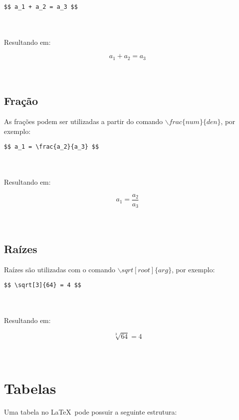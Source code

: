 \documentclass[12pt,a4paper]{article}
\begin{document}
\begin{BVerbatim}
$$ a_1 + a_2 = a_3 $$ 
\end{BVerbatim}
\\
\\
Resultando em: 

$$ a_1 + a_2 = a_3 $$ 
\\
\\

\subsection{Fração}

As frações podem ser utilizadas a partir do comando $\backslash frac\{num\}\{den\} $, por exemplo:

\begin{BVerbatim}
$$ a_1 = \frac{a_2}{a_3} $$ 
\end{BVerbatim}
\\
\\
Resultando em: 

$$ a_1 = \frac{a_2}{a_3} $$ 
\\
\\

\subsection{Raízes}

Raízes são utilizadas com o comando $ \backslash sqrt[root]\{arg\} $, por exemplo:

\begin{BVerbatim}
$$ \sqrt[3]{64} = 4 $$ 
\end{BVerbatim}
\\
\\
Resultando em: 

$$ \sqrt[3]{64} = 4 $$ 
\\
\\

\section{Tabelas}

Uma tabela no \LaTeX \ pode possuir a seguinte estrutura:
\end{document}
